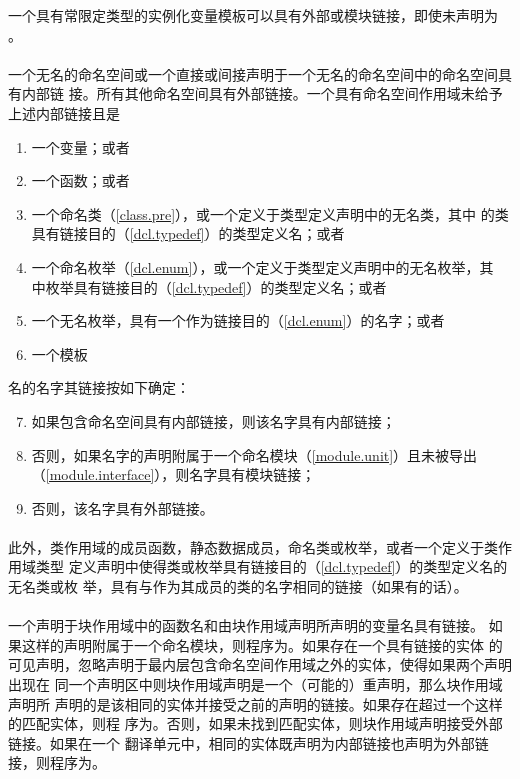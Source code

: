 \begin{note}
  一个具有常限定类型的实例化变量模板可以具有外部或模块链接，即使未声明为
  。
\end{note}

\paragraph{} %
一个无名的命名空间或一个直接或间接声明于一个无名的命名空间中的命名空间具有内部链
接。所有其他命名空间具有外部链接。一个具有命名空间作用域未给予上述内部链接且是
\begin{enumerate}
  \item 一个变量；或者
  \item 一个函数；或者
  \item 一个命名类（\ref{class.pre}），或一个定义于类型定义声明中的无名类，其中
        的类具有链接目的（\ref{dcl.typedef}）的类型定义名；或者
  \item 一个命名枚举（\ref{dcl.enum}），或一个定义于类型定义声明中的无名枚举，其
        中枚举具有链接目的（\ref{dcl.typedef}）的类型定义名；或者
  \item 一个无名枚举，具有一个\enumr{}作为链接目的（\ref{dcl.enum}）的名字；或者
  \item 一个模板
\end{enumerate}
名的名字其链接按如下确定：
\begin{enumerate}
  \setcounter{enumi}{6}
  \item 如果包含命名空间具有内部链接，则该名字具有内部链接；
  \item 否则，如果名字的声明附属于一个命名模块（\ref{module.unit}）且未被导出
        （\ref{module.interface}），则名字具有模块链接；
  \item 否则，该名字具有外部链接。
\end{enumerate}

\paragraph{} %
此外，类作用域的成员函数，静态数据成员，命名类或枚举，或者一个定义于类作用域类型
定义声明中使得类或枚举具有链接目的（\ref{dcl.typedef}）的类型定义名的无名类或枚
举，具有与作为其成员的类的名字相同的链接（如果有的话）。

\paragraph{} %
一个声明于块作用域中的函数名和由块作用域声明所声明的变量名具有链接。
如果这样的声明附属于一个命名模块，则程序为\illform{}。如果存在一个具有链接的实体
的可见声明，忽略声明于最内层包含命名空间作用域之外的实体，使得如果两个声明出现在
同一个声明区中则块作用域声明是一个（可能\illform{}的）重声明，那么块作用域声明所
声明的是该相同的实体并接受之前的声明的链接。如果存在超过一个这样的匹配实体，则程
序为\illform{}。否则，如果未找到匹配实体，则块作用域声明接受外部链接。如果在一个
翻译单元中，相同的实体既声明为内部链接也声明为外部链接，则程序为\illform{}。


